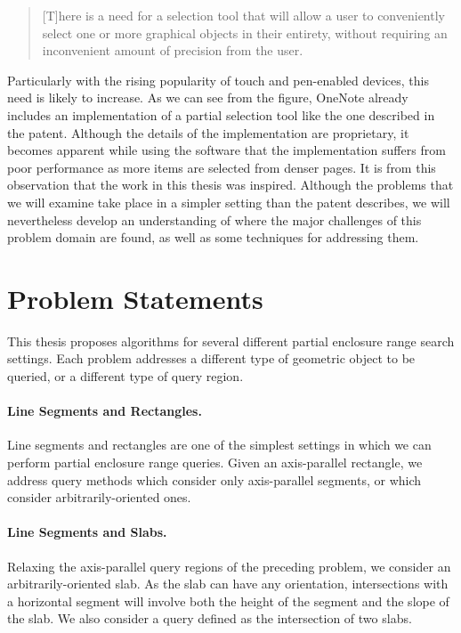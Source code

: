 \begin{quote}
[T]here is a need for a selection tool that will allow a user to conveniently select one or more graphical objects in their entirety, without requiring an inconvenient amount of precision from the user.
\end{quote}

\noindent Particularly with the rising popularity of touch and pen-enabled devices, this need is likely to increase.  
As we can see from the figure, OneNote already includes an implementation of a partial selection tool like the one described in the patent. 
Although the details of the implementation are proprietary, it becomes apparent while using the software that the implementation suffers from poor performance as more items are selected from denser pages.
It is from this observation that the work in this thesis was inspired.  
Although the problems that we will examine take place in a simpler setting than the patent describes, we will nevertheless develop an understanding of where the major challenges of this problem domain are found, as well as some techniques for addressing them.


\section{Problem Statements}
\label{:intro:problems}

This thesis proposes algorithms for several different partial enclosure range search settings.  Each problem addresses a different type of geometric object to be queried, or a different type of query region.

\paragraph{Line Segments and Rectangles.} Line segments and rectangles are one of the simplest settings in which we can perform partial enclosure range queries. 
Given an axis-parallel rectangle, we address query methods which consider only axis-parallel segments, or which consider arbitrarily-oriented ones.

\paragraph{Line Segments and Slabs.} Relaxing the axis-parallel query regions of the preceding problem, we consider an arbitrarily-oriented slab.
As the slab can have any orientation, intersections with a horizontal segment will involve both the height of the segment and the slope of the slab.  
We also consider a query defined as the intersection of two slabs.

